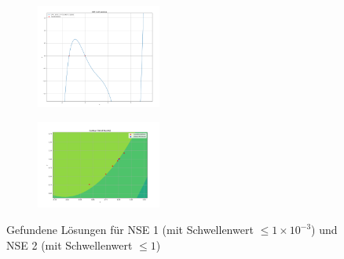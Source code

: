\documentclass{article}
\theoremstyle{newline}
\begin{document}
\begin{onehalfspace}
\begin{figure}[h]
	\centering
	\begin{subfigure}
		\centering
		\includegraphics[width=0.45\textwidth]{Bilder/solutions_nse1.png}
		\label{fig:solutions_nse1}
	\end{subfigure}
	\hfill
	\begin{subfigure}
		\centering
		\includegraphics[width=0.45\textwidth]{Bilder/solutions_nse2.png}
		\label{fig:solutions_nse2}
	\end{subfigure}
	\caption{Gefundene Lösungen für NSE 1 (mit Schwellenwert $\leq 1 \times 10^{-3}$) und NSE 2 (mit Schwellenwert $\leq 1$)}
	\label{fig:solutions_nse1_nse2}
\end{figure}


\end{onehalfspace}
\end{document}
